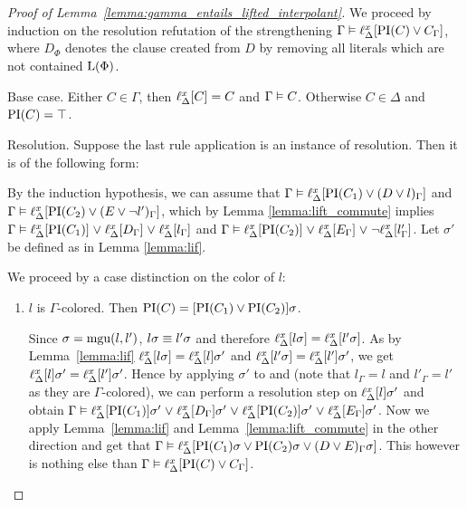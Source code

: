 \begin{proof}[Proof of Lemma~\ref{lemma:gamma_entails_lifted_interpolant}]
	We proceed by induction on the resolution refutation of the strengthening $\Gamma \entails \lifdelta{\PI(C) \lor\nolinebreak C_\Gamma}$,
	where $D_\Phi$ denotes the clause created from $D$ by removing all literals which are not contained $\operatorname{L}(\Phi)$.

	\begin{description}
		\item{Base case.}
			Either $C \in \Gamma$, then $\ell_{\Delta}^{x}[C] = C$ and $\Gamma \vDash C$.
			Otherwise $C \in \Delta$ and $\operatorname{PI}(C) = \top$.

		\item{Resolution.}
			Suppose the last rule application is an instance of resolution. Then it is of the following form:
			\begin{prooftree}
			\end{prooftree}

			By the induction hypothesis, we can assume that
			$\Gamma \vDash \ell_{\Delta}^{x}[\operatorname{PI}(C_1) \lor (D\lor l)_\Gamma]$ and $\Gamma \vDash \ell_{\Delta}^{x}[\operatorname{PI}(C_2) \lor (E\lor \lnot l')_\Gamma]$,
			which by Lemma \ref{lemma:lift_commute} implies 
			\markA{} $\Gamma \vDash \ell_{\Delta}^{x}[\operatorname{PI}(C_1)] \;{\lor}\;\allowbreak \ell_{\Delta}^{x}[D_\Gamma] \;{\lor}\;\allowbreak \ell_{\Delta}^{x}[l_\Gamma]$ and \markB{} $\Gamma \vDash \ell_{\Delta}^{x}[\operatorname{PI}(C_2)] \;{\lor}\; \ell_{\Delta}^{x}[E_\Gamma] \;{\lor}\; \lnot \ell_{\Delta}^{x}[l'_\Gamma]$.
			Let $\sigma'$ be defined as in Lemma \ref{lemma:lif}.

			We proceed by a case distinction on the color of $l$:
			\begin{enumerate}
				\item $l$ is $\Gamma$-colored. Then $\operatorname{PI}(C) = [\operatorname{PI}(C_1) \lor \operatorname{PI}(C_2)]\sigma$.

					Since $\sigma = \operatorname{mgu}(l, l')$, $l\sigma \equiv l'\sigma$ and therefore $\ell_{\Delta}^{x}[l\sigma] = \ell_{\Delta}^{x}[l'\sigma]$.
					As by Lemma~\ref{lemma:lif} $\ell_{\Delta}^{x}[l\sigma] = \ell_{\Delta}^{x}[l]\sigma'$ and $\ell_{\Delta}^{x}[l'\sigma] = \ell_{\Delta}^{x}[l']\sigma'$,
					we get $\ell_{\Delta}^{x}[l]\sigma' = \ell_{\Delta}^{x}[l']\sigma'$.\label{aou5jklah}
					Hence by applying $\sigma'$ to \markA{} and \markB{} (note that $l_\Gamma = l$ and $l'_\Gamma = l'$ as they are $\Gamma$-colored), we can perform a resolution step on $\ell_{\Delta}^{x}[l]\sigma'$ and obtain
					$\Gamma \vDash \ell_{\Delta}^{x}[\operatorname{PI}(C_1)]\sigma' \;{\lor}\; \ell_{\Delta}^{x}[D_\Gamma] \sigma' \;{\lor}\; \ell_{\Delta}^{x}[\operatorname{PI}(C_2)]\sigma' \;{\lor}\; \ell_{\Delta}^{x}[E_\Gamma] \sigma'$.
					Now we apply Lemma~\ref{lemma:lif} and Lemma~\ref{lemma:lift_commute} in the other direction 
					and get that 
					$\Gamma \vDash \ell_{\Delta}^{x}[\operatorname{PI}(C_1)\sigma \lor \operatorname{PI}(C_2)\sigma \lor\allowbreak (D \lor E)_\Gamma \sigma]$.
					This however is nothing else than 
					$\Gamma \vDash \ell_{\Delta}^{x}[\operatorname{PI}(C) \lor C_\Gamma]$.


\end{enumerate}
\end{description}
\end{proof}
